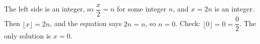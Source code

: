 The left side is an integer, so $\dfrac {x}{2}=n$ for some integer $n$, and $x=2n$ is an integer. Then $\lfloor x\rfloor=2n$, and the equation says $2n=n$, so $n=0$. Check: $\lfloor0\rfloor=0=\dfrac{0}{2}$. The only solution is $\boxed{x=0}$.
